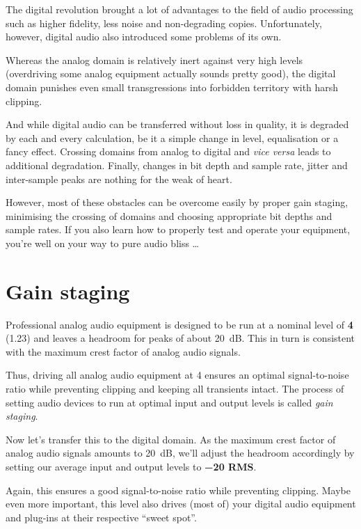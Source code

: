 The digital revolution brought a lot of advantages to the field of
audio processing such as higher fidelity, less noise and non-degrading
copies.  Unfortunately, however, digital audio also introduced some
problems of its own.

Whereas the analog domain is relatively inert against very high levels
(overdriving some analog equipment actually sounds pretty good), the
digital domain punishes even small transgressions into forbidden
territory with harsh clipping.

And while digital audio can be transferred without loss in quality, it
is degraded by each and every calculation, be it a simple change in
level, equalisation or a fancy effect.  Crossing domains from analog
to digital and \emph{vice versa} leads to additional degradation.
Finally, changes in bit depth and sample rate, jitter and inter-sample
peaks are nothing for the weak of heart.

However, most of these obstacles can be overcome easily by proper gain
staging, minimising the crossing of domains and choosing appropriate
bit depths and sample rates.  If you also learn how to properly test
and operate your equipment, you're well on your way to pure audio
bliss \dots

\section{Gain staging}
\label{sec:gain_staging}

Professional analog audio equipment is designed to be run at a nominal
level of \textbf{\SI[addsign=all]{+4}{\dBu}} (\SI{1.23}{\VRMS}) and
leaves a headroom for peaks of about \SI{20}{\dB}.  This in turn is
consistent with the maximum crest factor of analog audio signals.

Thus, driving all analog audio equipment at \SI[addsign=all]{+4}{\dBu}
ensures an optimal signal-to-noise ratio while preventing clipping and
keeping all transients intact.  The process of setting audio devices
to run at optimal input and output levels is called \emph{gain
  staging}.

Now let's transfer this to the digital domain.  As the maximum crest
factor of analog audio signals amounts to \SI{20}{\dB}, we'll adjust
the headroom accordingly by setting our average input and output
levels to \textbf{\SI{-20}{\dBFS} RMS}.

Again, this ensures a good signal-to-noise ratio while preventing
clipping.  Maybe even more important, this level also drives (most of)
your digital audio equipment and plug-ins at their respective ``sweet
spot''.

